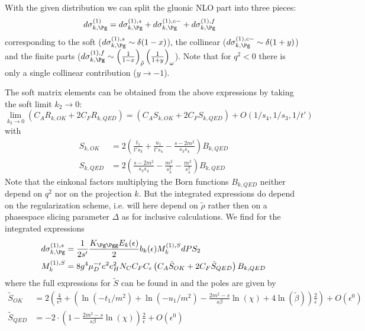 With the given distribution we can split the gluonic NLO part into three pieces\cite{Harris:1995tu}:
\begin{align}
d\sigma_{k,\Pg}^{(1)} &= d\sigma_{k,\Pg}^{(1),s} + d\sigma_{k,\Pg}^{(1),c-} + d\sigma_{k,\Pg}^{(1),f}
\end{align}
corresponding to the soft ($d\sigma_{k,\Pg}^{(1),s} \sim \delta(1-x)$), the collinear ($d\sigma_{k,\Pg}^{(1),c-} \sim \delta(1+y)$) and the finite parts ($d\sigma_{k,\Pg}^{(1),f} \sim \left(\frac 1 {1-x}\right)_{\tilde \rho}\left(\frac 1 {1+y}\right)_{\omega}$). Note that for $q^2 < 0$ there is only a single collinear contribution ($y\rightarrow -1$).

The soft matrix elements can be obtained from the above expressions by taking the soft limit $k_2\rightarrow 0$:
\begin{equation}
\lim_{k_2\rightarrow 0}\left(C_A R_{k,OK} + 2C_F R_{k,QED}\right) = \left(C_A S_{k,OK} + 2C_F S_{k,QED}\right) + O(1/s_4,1/s_3,1/t')
\end{equation}
with
\begin{align}
S_{k,OK}  &= 2\left(\frac{t_1}{t's_3} + \frac{u_1}{t's_4}-\frac{s-2m^2}{s_3s_4}\right)B_{k,QED}\\
S_{k,QED} &= 2\left(\frac{s-2m^2}{s_3s_4} - \frac{m^2}{s_3^2} - \frac{m^2}{s_4^2}\right)B_{k,QED}
\end{align}
Note that the einkonal factors multiplying the Born functions $B_{k,QED}$ neither depend on $q^2$ nor on the projection $k$. But the integrated expressions do depend on the regularization scheme, i.e. will here depend on $\tilde\rho$ rather then on a phasespace slicing parameter $\Delta$ as for inclusive calculations\cite{Laenen1993162}. We find for the integrated expressions
\begin{align}
d\sigma_{k,\Pg}^{(1),s} &= \frac 1 {2s'}\frac {K_{\Pg\Pgg}E_k(\epsilon)} 2  b_k(\epsilon) M_k^{(1),S} dPS_2\\
M_k^{(1),S} &= 8g^4\mu_D^{-\epsilon}e^2e_H^2 N_C C_F C_\epsilon\left( C_A \tilde S_{OK} + 2C_F \tilde S_{QED}\right) B_{k,QED}
\end{align}
where the full expressions for $\tilde S$ can be found in \cite{Harris:1995tu} and the poles are given by
\begin{align}
\tilde S_{OK} &= 2\left(\frac 4 {\epsilon^2} + \left(\ln(-t_1/m^2) + \ln(-u_1/m^2) - \frac{2m^2-s}{s\beta}\ln(\chi) + 4\ln(\tilde\beta)\right)\frac 2 {\epsilon}\right) + O(\epsilon^0)\\
\tilde S_{QED} &=-2\cdot \left(1 - \frac{2m^2-s}{s\beta}\ln(\chi)\right)\frac 2 \epsilon + O(\epsilon^0)
\end{align}
